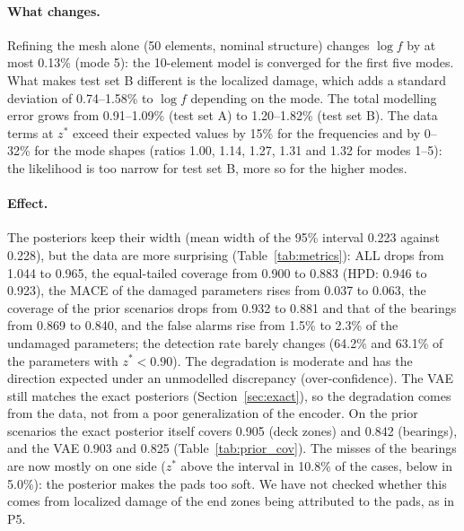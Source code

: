 \documentclass[11pt]{article}
\begin{document}
\paragraph{What changes.} Refining the mesh alone (50 elements, nominal structure) changes $\log f$ by at most 0.13\%
(mode 5): the 10-element model is converged for the first five modes. What makes test set B different is the localized
damage, which adds a standard deviation of 0.74--1.58\% to $\log f$ depending on the mode. The total modelling error
grows from 0.91--1.09\% (test set A) to 1.20--1.82\% (test set B). The data terms at $z^*$ exceed their expected
values by 15\% for the frequencies and by 0--32\% for the mode shapes (ratios 1.00, 1.14, 1.27, 1.31 and 1.32 for
modes 1--5): the likelihood is too narrow for test set B, more so for the higher modes.

\paragraph{Effect.} The posteriors keep their width (mean width of the 95\% interval 0.223 against 0.228), but the data
are more surprising (Table~\ref{tab:metrics}): ALL drops from 1.044 to 0.965, the equal-tailed coverage from 0.900 to
0.883 (HPD: 0.946 to 0.923), the MACE of the damaged parameters rises from 0.037 to 0.063, the coverage of the prior
scenarios drops from 0.932 to 0.881 and that of the bearings from 0.869 to 0.840, and the false alarms rise from 1.5\%
to 2.3\% of the undamaged parameters; the detection rate barely changes (64.2\% and 63.1\% of the parameters with
$z^*<0.90$). The degradation is moderate and has the direction expected under an unmodelled discrepancy
(over-confidence). The VAE still matches the exact posteriors (Section~\ref{sec:exact}), so the degradation comes from
the data, not from a poor generalization of the encoder. On the prior scenarios the exact posterior itself covers
0.905 (deck zones) and 0.842 (bearings), and the VAE 0.903 and 0.825 (Table~\ref{tab:prior_cov}). The misses of the
bearings are now mostly on one side ($z^*$ above the interval in 10.8\% of the cases, below in 5.0\%): the posterior
makes the pads too soft. We have not checked whether this comes from localized damage of the end zones being
attributed to the pads, as in P5.
\end{document}
